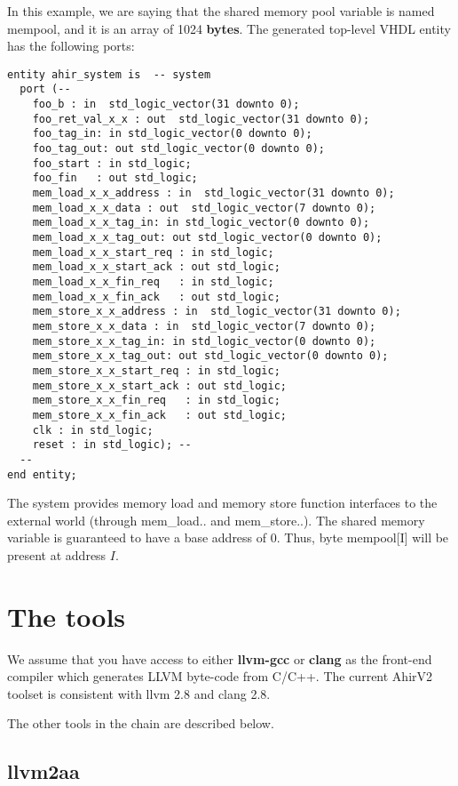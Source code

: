 In this example, we are saying that the shared memory pool
variable is named mempool, and it is an array of 1024 {\bf bytes}.
The generated top-level VHDL entity has the following
ports:
\begin{verbatim}
entity ahir_system is  -- system
  port (--
    foo_b : in  std_logic_vector(31 downto 0);
    foo_ret_val_x_x : out  std_logic_vector(31 downto 0);
    foo_tag_in: in std_logic_vector(0 downto 0);
    foo_tag_out: out std_logic_vector(0 downto 0);
    foo_start : in std_logic;
    foo_fin   : out std_logic;
    mem_load_x_x_address : in  std_logic_vector(31 downto 0);
    mem_load_x_x_data : out  std_logic_vector(7 downto 0);
    mem_load_x_x_tag_in: in std_logic_vector(0 downto 0);
    mem_load_x_x_tag_out: out std_logic_vector(0 downto 0);
    mem_load_x_x_start_req : in std_logic;
    mem_load_x_x_start_ack : out std_logic;
    mem_load_x_x_fin_req   : in std_logic;
    mem_load_x_x_fin_ack   : out std_logic;
    mem_store_x_x_address : in  std_logic_vector(31 downto 0);
    mem_store_x_x_data : in  std_logic_vector(7 downto 0);
    mem_store_x_x_tag_in: in std_logic_vector(0 downto 0);
    mem_store_x_x_tag_out: out std_logic_vector(0 downto 0);
    mem_store_x_x_start_req : in std_logic;
    mem_store_x_x_start_ack : out std_logic;
    mem_store_x_x_fin_req   : in std_logic;
    mem_store_x_x_fin_ack   : out std_logic;
    clk : in std_logic;
    reset : in std_logic); --
  --
end entity;
\end{verbatim}

The system provides  memory load and memory store
function interfaces to the external world 
(through  mem\_load.. and mem\_store..).
The shared memory variable is guaranteed to have a base address of $0$.  Thus,
byte mempool[I] will be present at address $I$.

\section{The tools}

We assume that you have access to either {\bf llvm-gcc}
or {\bf clang} as the front-end compiler which generates
LLVM byte-code from C/C++.  The current AhirV2 toolset
is consistent with llvm 2.8 and clang 2.8.

The other tools in the chain are described below.

\subsection{{\bf llvm2aa}}

